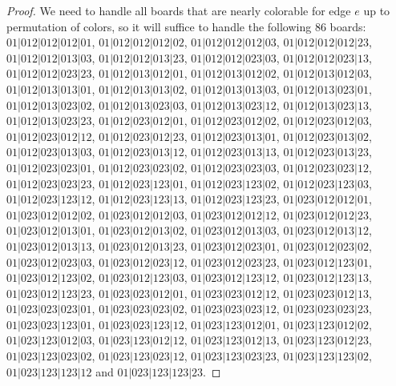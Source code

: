 \documentclass[12pt]{article}
\begin{document}
\begin{proof}
We need to handle all boards that are nearly colorable for edge $e$ up to permutation of colors, so it will suffice to handle the following 86 boards: $01|012|012|012|01$, $01|012|012|012|02$, $01|012|012|012|03$, $01|012|012|012|23$, $01|012|012|013|03$, $01|012|012|013|23$, $01|012|012|023|03$, $01|012|012|023|13$, $01|012|012|023|23$, $01|012|013|012|01$, $01|012|013|012|02$, $01|012|013|012|03$, $01|012|013|013|01$, $01|012|013|013|02$, $01|012|013|013|03$, $01|012|013|023|01$, $01|012|013|023|02$, $01|012|013|023|03$, $01|012|013|023|12$, $01|012|013|023|13$, $01|012|013|023|23$, $01|012|023|012|01$, $01|012|023|012|02$, $01|012|023|012|03$, $01|012|023|012|12$, $01|012|023|012|23$, $01|012|023|013|01$, $01|012|023|013|02$, $01|012|023|013|03$, $01|012|023|013|12$, $01|012|023|013|13$, $01|012|023|013|23$, $01|012|023|023|01$, $01|012|023|023|02$, $01|012|023|023|03$, $01|012|023|023|12$, $01|012|023|023|23$, $01|012|023|123|01$, $01|012|023|123|02$, $01|012|023|123|03$, $01|012|023|123|12$, $01|012|023|123|13$, $01|012|023|123|23$, $01|023|012|012|01$, $01|023|012|012|02$, $01|023|012|012|03$, $01|023|012|012|12$, $01|023|012|012|23$, $01|023|012|013|01$, $01|023|012|013|02$, $01|023|012|013|03$, $01|023|012|013|12$, $01|023|012|013|13$, $01|023|012|013|23$, $01|023|012|023|01$, $01|023|012|023|02$, $01|023|012|023|03$, $01|023|012|023|12$, $01|023|012|023|23$, $01|023|012|123|01$, $01|023|012|123|02$, $01|023|012|123|03$, $01|023|012|123|12$, $01|023|012|123|13$, $01|023|012|123|23$, $01|023|023|012|01$, $01|023|023|012|12$, $01|023|023|012|13$, $01|023|023|023|01$, $01|023|023|023|02$, $01|023|023|023|12$, $01|023|023|023|23$, $01|023|023|123|01$, $01|023|023|123|12$, $01|023|123|012|01$, $01|023|123|012|02$, $01|023|123|012|03$, $01|023|123|012|12$, $01|023|123|012|13$, $01|023|123|012|23$, $01|023|123|023|02$, $01|023|123|023|12$, $01|023|123|023|23$, $01|023|123|123|02$, $01|023|123|123|12$ and $01|023|123|123|23$.



\end{proof}
\end{document}

